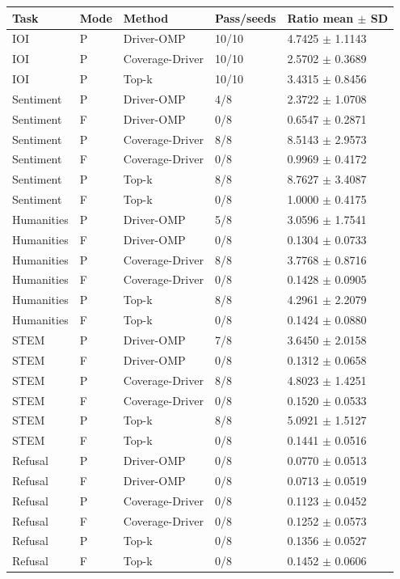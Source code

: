 \begin{tabular}{lllll}
\toprule
Task & Mode & Method & Pass/seeds & Ratio mean $\pm$ SD \\
\midrule
IOI & P & Driver-OMP & 10/10 & 4.7425 $\pm$ 1.1143 \\
IOI & P & Coverage-Driver & 10/10 & 2.5702 $\pm$ 0.3689 \\
IOI & P & Top-k & 10/10 & 3.4315 $\pm$ 0.8456 \\
Sentiment & P & Driver-OMP & 4/8 & 2.3722 $\pm$ 1.0708 \\
Sentiment & F & Driver-OMP & 0/8 & 0.6547 $\pm$ 0.2871 \\
Sentiment & P & Coverage-Driver & 8/8 & 8.5143 $\pm$ 2.9573 \\
Sentiment & F & Coverage-Driver & 0/8 & 0.9969 $\pm$ 0.4172 \\
Sentiment & P & Top-k & 8/8 & 8.7627 $\pm$ 3.4087 \\
Sentiment & F & Top-k & 0/8 & 1.0000 $\pm$ 0.4175 \\
Humanities & P & Driver-OMP & 5/8 & 3.0596 $\pm$ 1.7541 \\
Humanities & F & Driver-OMP & 0/8 & 0.1304 $\pm$ 0.0733 \\
Humanities & P & Coverage-Driver & 8/8 & 3.7768 $\pm$ 0.8716 \\
Humanities & F & Coverage-Driver & 0/8 & 0.1428 $\pm$ 0.0905 \\
Humanities & P & Top-k & 8/8 & 4.2961 $\pm$ 2.2079 \\
Humanities & F & Top-k & 0/8 & 0.1424 $\pm$ 0.0880 \\
STEM & P & Driver-OMP & 7/8 & 3.6450 $\pm$ 2.0158 \\
STEM & F & Driver-OMP & 0/8 & 0.1312 $\pm$ 0.0658 \\
STEM & P & Coverage-Driver & 8/8 & 4.8023 $\pm$ 1.4251 \\
STEM & F & Coverage-Driver & 0/8 & 0.1520 $\pm$ 0.0533 \\
STEM & P & Top-k & 8/8 & 5.0921 $\pm$ 1.5127 \\
STEM & F & Top-k & 0/8 & 0.1441 $\pm$ 0.0516 \\
Refusal & P & Driver-OMP & 0/8 & 0.0770 $\pm$ 0.0513 \\
Refusal & F & Driver-OMP & 0/8 & 0.0713 $\pm$ 0.0519 \\
Refusal & P & Coverage-Driver & 0/8 & 0.1123 $\pm$ 0.0452 \\
Refusal & F & Coverage-Driver & 0/8 & 0.1252 $\pm$ 0.0573 \\
Refusal & P & Top-k & 0/8 & 0.1356 $\pm$ 0.0527 \\
Refusal & F & Top-k & 0/8 & 0.1452 $\pm$ 0.0606 \\
\bottomrule
\end{tabular}
